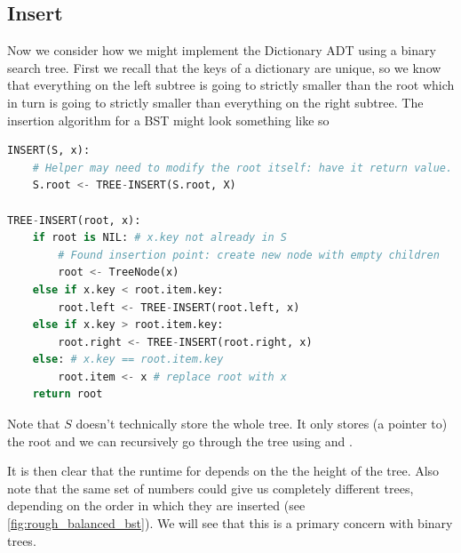 \subsection{Insert}
Now we consider how we might implement the Dictionary ADT using a binary search tree. First we recall that the keys of a dictionary are unique, so we know that everything on the left subtree is going to strictly smaller than the root which in turn is going to strictly smaller than everything on the right subtree. The insertion algorithm for a BST might look something like so\\
\begin{lstlisting}[language=Python]
INSERT(S, x):
    # Helper may need to modify the root itself: have it return value.
    S.root <- TREE-INSERT(S.root, X)
    
TREE-INSERT(root, x):
    if root is NIL: # x.key not already in S
        # Found insertion point: create new node with empty children
        root <- TreeNode(x)
    else if x.key < root.item.key:
        root.left <- TREE-INSERT(root.left, x)
    else if x.key > root.item.key:
        root.right <- TREE-INSERT(root.right, x)
    else: # x.key == root.item.key
        root.item <- x # replace root with x
    return root
\end{lstlisting}
\begin{remark}
    Note that $S$ doesn't technically store the whole tree. It only stores (a pointer to) the root and we can recursively go through the tree using  and .
\end{remark}

It is then clear that the runtime for  depends on the the height of the tree. Also note that the same set of numbers could give us completely different trees, depending on the order in which they are inserted (see \autoref{fig:rough_balanced_bst}). We will see that this is a primary concern with binary trees.

